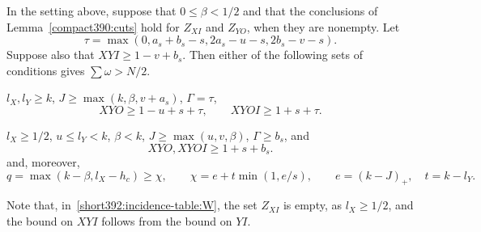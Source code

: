 \begin{lemma}
\label{short392:incidence-table-two}\label{compact390:regular-certificate}\label{compact390:weak-certificate}
In the setting above, suppose that $0\le\beta<1/2$ and that the conclusions of
Lemma~\ref{compact390:cuts} hold for $Z_{XI}$ and $Z_{YO}$, when they are nonempty. Let
\[
 \tau=\max(0,a_s+b_s-s,2a_s-u-s,2b_s-v-s).
\]
Suppose also that $XYI\ge1-v+b_s$.
Then either of the following sets of conditions gives $\sum\omega>N/2$.
\begin{props}
\item\label{short392:incidence-table:R} $l_X,l_Y\ge k$, $J\ge\max(k,\beta,v+a_s)$, $\Gamma=\tau$,
\[
 XYO\ge1-u+s+\tau,\qquad XYOI\ge1+s+\tau.
\]
\item\label{short392:incidence-table:W} $l_X\ge1/2$, $u\le l_Y<k$, $\beta<k$,
$J\ge\max(u,v,\beta)$, $\Gamma\ge b_s$, and
\[
                  XYO,XYOI\ge1+s+b_s.
\]
and, moreover,
\[
 q=\max(k-\beta,l_X-h_c)\ge\chi,\qquad\chi=e+t\min(1,e/s),
 \qquad e=(k-J)_+,\quad t=k-l_Y.
\]
\end{props}
Note that, in~\ref{short392:incidence-table:W}, the set $Z_{XI}$ is empty, as $l_X\ge1/2$, and the bound on $XYI$ follows from the bound on $YI$.
\end{lemma}
